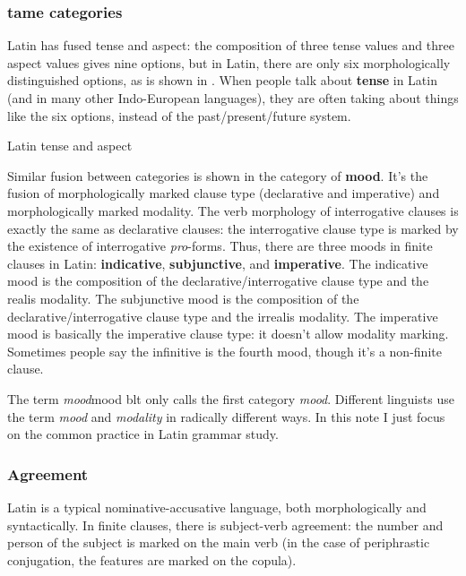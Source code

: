 \documentclass[UTF8, a4paper, oneside, scheme=plain]{ctexrep}
\newcommand*{\concept}[1]{\textbf{#1}}
\newcommand*{\term}[1]{\emph{#1}}
\begin{document}
\subsubsection{\acs{tame} categories}

Latin has fused tense and aspect:
the composition of three tense values and three aspect values 
gives nine options,
but in Latin, there are only six morphologically distinguished options,
as is shown in . 
When people talk about \concept{tense} in Latin (and in many other Indo-European languages),
they are often taking about things like the six options,
instead of the past/present/future system.

\begin{table}[H]
    \caption{Latin tense and aspect}
    \label{tbl:latin-tense-aspect}
    \centering
        
\end{table}

Similar fusion between categories is shown in the category of \concept{mood}.
It's the fusion of morphologically marked clause type 
(declarative and imperative)
and morphologically marked modality.
The verb morphology of interrogative clauses is exactly the same as declarative clauses:
the interrogative clause type is marked by the existence of interrogative \term{pro}-forms.
Thus, there are three moods in finite clauses in Latin:
\concept{indicative}, \concept{subjunctive}, and \concept{imperative}.
The indicative mood is the composition of 
the declarative/interrogative clause type and the realis modality.
The subjunctive mood is the composition of 
the declarative/interrogative clause type and the irrealis modality.
The imperative mood is basically the imperative clause type:
it doesn't allow modality marking.
Sometimes people say the infinitive is the fourth mood,
though it's a non-finite clause.

\begin{theorybox}{The term \term{mood}}{mood}
    \acs{blt} only calls the first category \term{mood}.
    Different linguists use the term \term{mood} and \term{modality} in radically different ways.
    In this note I just focus on the common practice in Latin grammar study.
\end{theorybox}

\subsubsection{Agreement}

Latin is a typical nominative-accusative language,
both morphologically and syntactically.
In finite clauses, 
there is subject-verb agreement:
the number and person of the subject is marked on the main verb
(in the case of periphrastic conjugation,
the features are marked on the copula).
\end{document}
